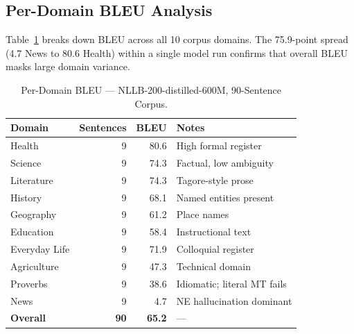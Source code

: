 \documentclass[journal]{IEEEtran}
\begin{document}
\begin{table}[htbp]
\caption{Inference Throughput --- NLLB-200-distilled-600M.}
\label{tab:throughput}
\centering
{}
\end{table}

\subsection{Per-Domain BLEU Analysis}

Table~\ref{tab:domain_bleu} breaks down BLEU across all 10 corpus domains.
The 75.9-point spread (4.7 News to 80.6 Health) within a single model run
confirms that overall BLEU masks large domain variance.

\begin{table}[htbp]
\caption{Per-Domain BLEU --- NLLB-200-distilled-600M, 90-Sentence Corpus.}
\label{tab:domain_bleu}
\centering
\begin{tabular}{lrrp{2.6cm}}
\toprule
Domain & Sentences & BLEU & Notes \\
\midrule
Health         & 9 & 80.6 & High formal register \\
Science        & 9 & 74.3 & Factual, low ambiguity \\
Literature     & 9 & 74.3 & Tagore-style prose \\
History        & 9 & 68.1 & Named entities present \\
Geography      & 9 & 61.2 & Place names \\
Education      & 9 & 58.4 & Instructional text \\
Everyday Life  & 9 & 71.9 & Colloquial register \\
Agriculture    & 9 & 47.3 & Technical domain \\
Proverbs       & 9 & 38.6 & Idiomatic; literal MT fails \\
News           & 9 &  4.7 & NE hallucination dominant \\
\midrule
\textbf{Overall} & \textbf{90} & \textbf{65.2} & --- \\
\bottomrule
\end{tabular}
\end{table}
\end{document}
